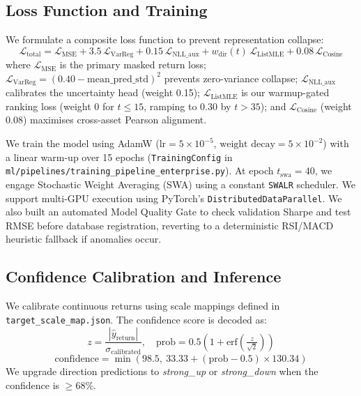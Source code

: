 \documentclass{article}
\begin{document}
\subsection{Loss Function and Training}

We formulate a composite loss function to prevent representation collapse:
\begin{equation}
  \mathcal{L}_{\mathrm{total}} = \mathcal{L}_{\mathrm{MSE}} + 3.5\,\mathcal{L}_{\mathrm{VarReg}} + 0.15\,\mathcal{L}_{\mathrm{NLL\_aux}} + w_{\mathrm{dir}}(t)\,\mathcal{L}_{\mathrm{ListMLE}} + 0.08\,\mathcal{L}_{\mathrm{Cosine}}
\end{equation}
where $\mathcal{L}_{\mathrm{MSE}}$ is the primary masked return loss; $\mathcal{L}_{\mathrm{VarReg}} = (0.40-\text{mean\_pred\_std})^2$ prevents zero-variance collapse; $\mathcal{L}_{\mathrm{NLL\_aux}}$ calibrates the uncertainty head (weight 0.15); $\mathcal{L}_{\mathrm{ListMLE}}$ is our warmup-gated ranking loss (weight 0 for $t\le15$, ramping to 0.30 by $t>35$); and $\mathcal{L}_{\mathrm{Cosine}}$ (weight 0.08) maximises cross-asset Pearson alignment.

We train the model using AdamW ($\text{lr} = 5 \times 10^{-5}$, $\text{weight decay} = 5 \times 10^{-2}$) with a linear warm-up over 15 epochs (\texttt{TrainingConfig} in \texttt{ml/pipelines/training\_pipeline\_enterprise.py}). At epoch $t_{\mathrm{swa}}=40$, we engage Stochastic Weight Averaging (SWA) using a constant \texttt{SWALR} scheduler. We support multi-GPU execution using PyTorch's \texttt{DistributedDataParallel}. We also built an automated Model Quality Gate to check validation Sharpe and test RMSE before database registration, reverting to a deterministic RSI/MACD heuristic fallback if anomalies occur.

\subsection{Confidence Calibration and Inference}

We calibrate continuous returns using scale mappings defined in \texttt{target\_scale\_map.json}. The confidence score is decoded as:
\begin{equation}
  z = \frac{|\hat{y}_{\mathrm{return}}|}{\sigma_{\mathrm{calibrated}}}, \quad \mathrm{prob} = 0.5\!\left(1 + \mathrm{erf}\!\left(\tfrac{z}{\sqrt{2}}\right)\right)
\end{equation}
\begin{equation}
  \mathrm{confidence} = \min(98.5,\ 33.33 + (\mathrm{prob} - 0.5) \times 130.34)
\end{equation}
We upgrade direction predictions to \textit{strong\_up} or \textit{strong\_down} when the confidence is $\ge 68\%$.
\end{document}
